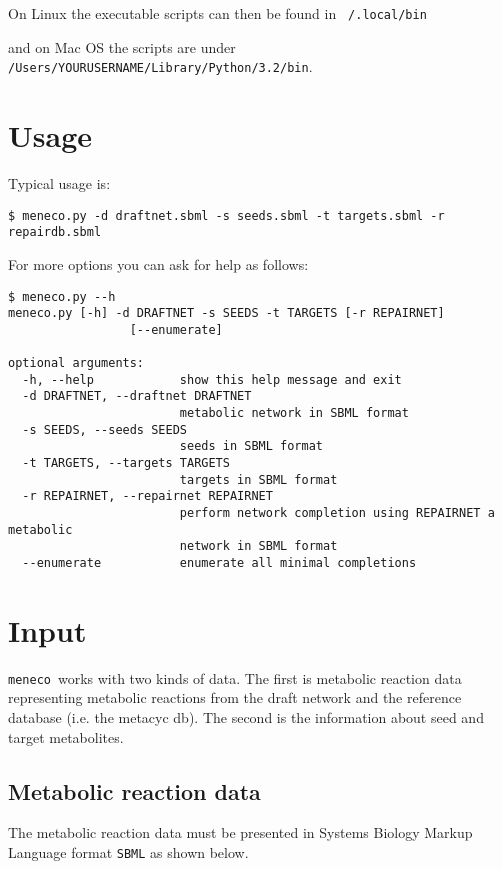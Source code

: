 \documentclass{article}
\newcommand\meneco{\texttt{meneco}}
\begin{document}
On Linux the executable scripts can then be found in \texttt{~/.local/bin}

and on Mac OS the scripts are under \texttt{/Users/YOURUSERNAME/Library/Python/3.2/bin}.



\section{Usage}

Typical usage is:
\begin{Verbatim}[frame=single]
$ meneco.py -d draftnet.sbml -s seeds.sbml -t targets.sbml -r repairdb.sbml
\end{Verbatim}
For more options you can ask for help as follows:
\begin{Verbatim}[frame=single]
$ meneco.py --h
meneco.py [-h] -d DRAFTNET -s SEEDS -t TARGETS [-r REPAIRNET]
                 [--enumerate]

optional arguments:
  -h, --help            show this help message and exit
  -d DRAFTNET, --draftnet DRAFTNET
                        metabolic network in SBML format
  -s SEEDS, --seeds SEEDS
                        seeds in SBML format
  -t TARGETS, --targets TARGETS
                        targets in SBML format
  -r REPAIRNET, --repairnet REPAIRNET
                        perform network completion using REPAIRNET a metabolic
                        network in SBML format
  --enumerate           enumerate all minimal completions
\end{Verbatim}


\section{Input}

\meneco\ works with two kinds of data.
The first is metabolic reaction data representing metabolic reactions from the draft network and the reference database (i.e. the metacyc db).
The second is the information about seed and target metabolites.


\subsection{Metabolic reaction data}

The metabolic reaction data must be presented in Systems Biology Markup Language format \texttt{SBML} as shown below.
\end{document}
